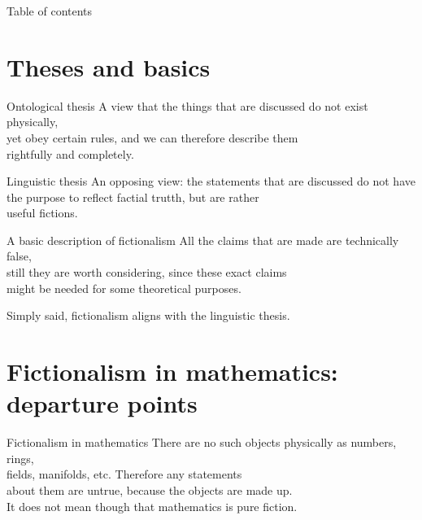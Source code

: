 \documentclass[12pt,aspectratio=169,svgnames]{beamer}
\begin{document}
 \maketitle

\begin{frame}{Table of contents}
	\tableofcontents
\end{frame}

\section{Theses and basics}

\begin{frame}{Ontological thesis}
	A view that the things that are discussed do not exist physically, \\
	yet obey certain rules, and we can therefore describe them \\
	rightfully and completely.
\end{frame}

\begin{frame}{Linguistic thesis}
	An opposing view: the statements that are discussed do not have \\
	the purpose to reflect factial trutth, but are rather \\
	useful fictions.
\end{frame}

\begin{frame}{A basic description of fictionalism}
	All the claims that are made are technically false, \\
	still they are worth considering, since these exact claims \\
	might be needed for some theoretical purposes. \bigskip

	Simply said, fictionalism aligns with the linguistic thesis.
\end{frame}

\section{Fictionalism in mathematics: departure points}

\begin{frame}{Fictionalism in mathematics}
	There are no such objects physically as numbers, rings, \\
	fields, manifolds, etc. Therefore any statements \\
	about them are untrue, because the objects are made up. \\
	It does not mean though that mathematics is pure fiction.
\end{frame}
\end{document}
